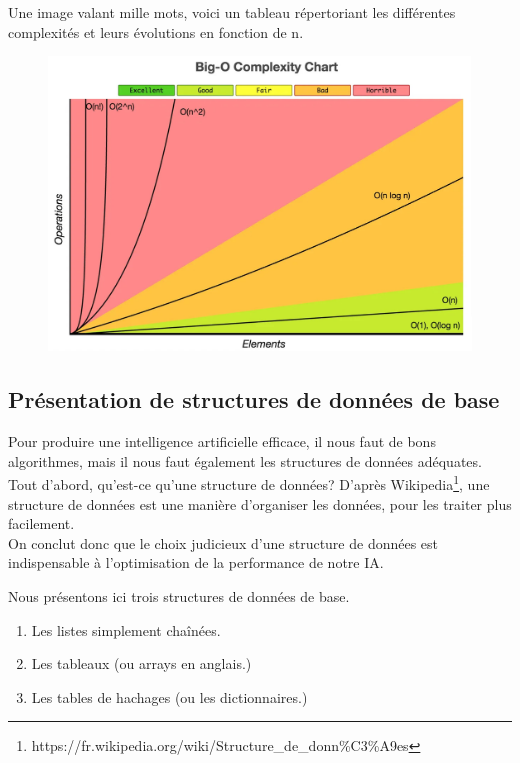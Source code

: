 \documentclass[a4paper, 12pt]{article}
\numberwithin{equation}{subsection}
\begin{document}
Une image valant mille mots, voici un tableau répertoriant les différentes complexités et leurs évolutions en fonction de n.
\begin{figure}[H]
  \centering
  \includegraphics[scale=0.3]{imgs/big-o.jpg}
\end{figure}
\subsection{Présentation de structures de données de base}
Pour produire une intelligence artificielle efficace, il nous faut de bons algorithmes, mais il nous faut également les structures de données adéquates. \\

Tout d'abord, qu'est-ce qu'une structure de données?
D'après Wikipedia\footnote{https://fr.wikipedia.org/wiki/Structure\_de\_donn\%C3\%A9es}, une structure de données est une manière d'organiser les données, pour les traiter plus facilement. \\
On conclut donc que le choix judicieux d'une structure de données est indispensable à l'optimisation de la performance de notre IA.

Nous présentons ici trois structures de données de base.
\begin{enumerate}
  \item Les listes simplement chaînées.
  \item Les tableaux (ou arrays en anglais.)
  \item Les tables de hachages (ou les dictionnaires.) \\[0.2cm]
\end{enumerate}
\end{document}
